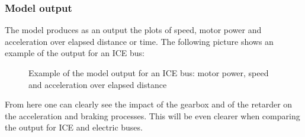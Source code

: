 \documentclass{article}
\begin{document}
\subsubsection{Model output}
The model produces as an output the plots of speed, motor power and acceleration over elapsed distance or time. The following picture shows an example of the output for an ICE bus: 
\begin{figure}[H]
\centering
{}
\caption{Example of the model output for an ICE bus: motor power, speed and acceleration over elapsed distance}
\end{figure} 
From here one can clearly see the impact of the gearbox and of the retarder on the acceleration and braking processes. This will be even clearer when comparing the output for ICE and electric buses.\\
\end{document}
